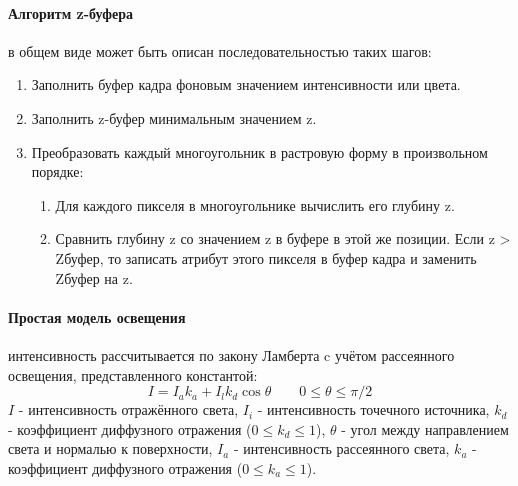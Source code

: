\paragraph{Алгоритм z-буфера}
в общем виде может быть описан последовательностью таких шагов:
\begin{enumerate}[1.]
	\item Заполнить буфер кадра фоновым значением интенсивности или цвета.
	\item Заполнить z-буфер минимальным значением z.
	\item Преобразовать каждый многоугольник в растровую форму в произвольном порядке:
	\begin{enumerate}
		\item Для каждого пикселя в многоугольнике вычислить его глубину z.
		\item Сравнить глубину z со значением z в буфере в этой же позиции. Если z > Zбуфер, то записать атрибут этого пикселя в буфер кадра и заменить Zбуфер на z.
	\end{enumerate}
\end{enumerate}

\paragraph{Простая модель освещения} интенсивность рассчитывается по закону Ламберта c учётом рассеянного освещения, представленного константой:
\begin{equation}\label{lambert2}
I = I_{a}k_{a} + I_{l}k_{d}\cos \theta \qquad 0\leq\theta\leq\pi/2
\end{equation}
$I$ - интенсивность отражённого света, $I_{i}$ - интенсивность точечного источника, $k_{d}$ - коэффициент диффузного отражения ($0\leq k_{d}\leq 1$), $\theta$ - угол между направлением света и нормалью к поверхности, $I_{a}$ - интенсивность рассеянного света, $k_{a}$ - коэффициент диффузного отражения ($0\leq k_{a}\leq 1$).

